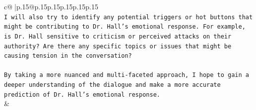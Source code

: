 \documentclass{article}
\begin{document}
{\begin{supertabular}{c@{$\;$}|p{.15\linewidth}@{}p{.15\linewidth}p{.15\linewidth}p{.15\linewidth}p{.15\linewidth}p{.15\linewidth}}
{{{\\ 
\texttt{I will also try to identify any potential triggers or hot buttons that might be contributing to Dr. Hall's emotional response. For example, is Dr. Hall sensitive to criticism or perceived attacks on their authority? Are there any specific topics or issues that might be causing tension in the conversation?} \\
\\ 
\texttt{By taking a more nuanced and multi{-}faceted approach, I hope to gain a deeper understanding of the dialogue and make a more accurate prediction of Dr. Hall's emotional response.} \\
            }
        }
    }
    & \\ \\

\end{supertabular}
}
\end{document}
